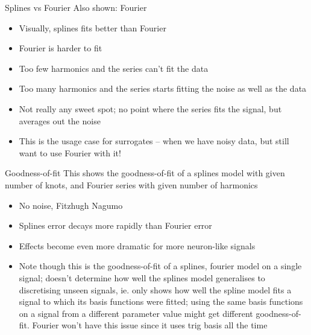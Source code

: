 \documentclass[presentation]{beamer}
\begin{document}
\begin{frame}[plain,label={sec:org66af2fa}]{Splines vs Fourier}
Also shown: Fourier

\begin{itemize}
\item Visually, splines fits better than Fourier
\item Fourier is harder to fit
\item Too few harmonics and the series can't fit the data
\item Too many harmonics and the series starts fitting the noise as well as the data
\item Not really any sweet spot; no point where the series fits the signal, but averages out the noise
\item This is the usage case for surrogates -- when we have noisy data, but still want to use Fourier with it!
\end{itemize}
\end{frame}

\begin{frame}[plain,label={sec:org0d501d7}]{Goodness-of-fit}
This shows the goodness-of-fit of a splines model with given number of knots, and Fourier series with given number of harmonics

\begin{itemize}
\item No noise, Fitzhugh Nagumo
\item Splines error decays more rapidly than Fourier error
\item Effects become even more dramatic for more neuron-like signals
\item Note though this is the goodness-of-fit of a splines, fourier model on a single signal; doesn't determine how well the splines model generalises to discretising unseen signals, ie. only shows how well the spline model fits a signal to which its basis functions were fitted; using the same basis functions on a signal from a different parameter value might get different goodness-of-fit. Fourier won't have this issue since it uses trig basis all the time
\end{itemize}
\end{frame}
\end{document}
